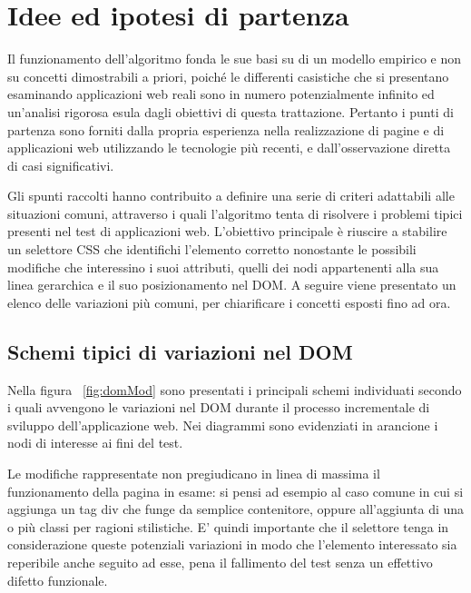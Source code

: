 \section{Idee ed ipotesi di partenza}

Il funzionamento dell'algoritmo fonda le sue basi su di un modello empirico e non su concetti dimostrabili a priori, poiché le differenti casistiche che si presentano esaminando applicazioni web reali sono in numero potenzialmente infinito ed un'analisi rigorosa esula dagli obiettivi di questa trattazione. Pertanto i punti di partenza sono forniti dalla propria esperienza nella realizzazione di pagine e di applicazioni web utilizzando le tecnologie più recenti, e dall'osservazione diretta di casi significativi.

Gli spunti raccolti hanno contribuito a definire una serie di criteri adattabili alle situazioni comuni, attraverso i quali l'algoritmo tenta di risolvere i problemi tipici presenti nel test di applicazioni web. L'obiettivo principale è riuscire a stabilire un selettore CSS che identifichi l'elemento corretto nonostante le possibili modifiche che interessino i suoi attributi, quelli dei nodi appartenenti alla sua linea gerarchica e il suo posizionamento nel DOM. A seguire viene presentato un elenco delle variazioni più comuni, per chiarificare i concetti esposti fino ad ora.

\subsection {Schemi tipici di variazioni nel DOM}

Nella figura ~\ref{fig:domMod} sono presentati i principali schemi individuati secondo i quali avvengono le variazioni nel DOM durante il processo incrementale di sviluppo dell'applicazione web. Nei diagrammi sono evidenziati in arancione i nodi di interesse ai fini del test. 

Le modifiche rappresentate non pregiudicano in linea di massima il funzionamento della pagina in esame: si pensi ad esempio al caso comune in cui si aggiunga un tag div che funge da semplice contenitore, oppure all'aggiunta di una o più classi per ragioni stilistiche. E' quindi importante che il selettore tenga in considerazione queste potenziali variazioni in modo che l'elemento interessato sia reperibile anche seguito ad esse, pena il fallimento del test senza un effettivo difetto funzionale.

